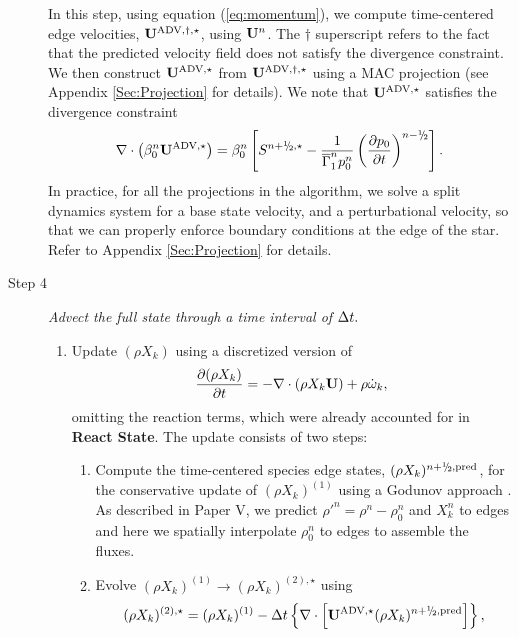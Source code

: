 \begin{description}
In this step, using equation (\ref{eq:momentum}), 
we compute time-centered edge velocities, ${\bf{U}}^{\mathrm{ADV},\dagger,\star}$, using
${\bf{U}}^n$.  The $\dagger$ superscript refers to the
fact that the predicted velocity field does not satisfy the divergence
constraint.  We then construct ${\bf{U}}^{\mathrm{ADV},\star}$ from ${\bf{U}}^{\mathrm{ADV},\dagger,\star}$
using a MAC projection (see Appendix \ref{Sec:Projection} for details).
We note that ${\bf{U}}^{\mathrm{ADV},\star}$ satisfies the divergence constraint
\begin{equation}
\nabla \cdot \left(\beta_0^n \uadvone\right) = \beta_0^n \left[S^{\nph,\star} - \frac{1}{\gammaonebar^np_0^n}\left(\frac{\partial p_0}{\partial t}\right)^{n-\myhalf} \right].\label{eq:div1}
\end{equation}
In practice, for all the projections in the algorithm, we solve a split dynamics
system for a base state velocity, and a perturbational velocity, so that we can properly
enforce boundary conditions at the edge of the star.
Refer to Appendix \ref{Sec:Projection} for details.

\item[Step 4] {\em Advect the full state through a time interval of $\Delta t.$}

\begin{enumerate}
\renewcommand{\theenumi}{{\bf \Alph{enumi}}}

\item Update $(\rho X_k)$ using a discretized version of
%
\begin{equation}
\frac{\partial(\rho X_k)}{\partial t} = -\nabla\cdot(\rho X_k\Ub) + \rho\omegadot_k,
\end{equation}
%
omitting the reaction terms, which were already
accounted for in {\bf React State}.  The update consists of two steps:

\begin{enumerate}
\renewcommand{\labelenumii}{{\bf \roman{enumii}}.}

\item Compute the time-centered species edge states, $(\rho X_k)^{\nph,\pred}$,
  for the conservative update of $(\rho X_k)^{(1)}$ using a Godunov approach \citep{XRB_III}.
  As described in Paper V, we predict $\rho'^n=\rho^n-\rho_0^n$ and $X_k^n$ to edges
  and here we spatially interpolate $\rho_0^n$ to edges to assemble the fluxes.

\item Evolve $(\rho X_k)^{(1)} \rightarrow (\rho X_k)^{(2),\star}$ using
\begin{equation}
(\rho X_k)^{(2),\star} = (\rho X_k)^{(1)}
  - \dt \left\{ \nabla \cdot \left[ \uadvone (\rho X_k)^{\nph,\pred} \right] \right\},
\end{equation}


\end{enumerate}
\end{enumerate}
\end{description}
